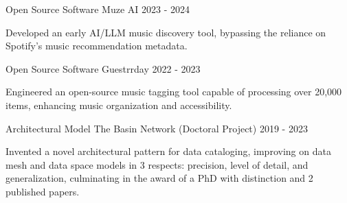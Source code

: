 

\begin{cventries}


  \cventry
    {Open Source Software} %
    {Muze AI} %
    {2023 - 2024} %
    {} %
    {
          \begin{cvitems} %
	        \item {Developed an early AI/LLM music discovery tool, bypassing the reliance on Spotify's music recommendation metadata.}
	      \end{cvitems}
    }



  \cventry
    {Open Source Software} %
    {Guestrrday} %
    {2022 - 2023} %
    {} %
    {
          \begin{cvitems} %
	        \item {Engineered an open-source music tagging tool capable of processing over 20,000 items, enhancing music organization and accessibility.}
	      \end{cvitems}
    }




  \cventry
    {Architectural Model} %
    {The Basin Network (Doctoral Project)} %
    {2019 - 2023} %
    {} %
    {
          \begin{cvitems} %
			\item {Invented a novel architectural pattern for data cataloging, improving on data mesh and data space models in 3 respects: precision, level of detail, and generalization, culminating in the award of a PhD with distinction and 2 published papers.}
	      \end{cvitems}
    }



\end{cventries}
